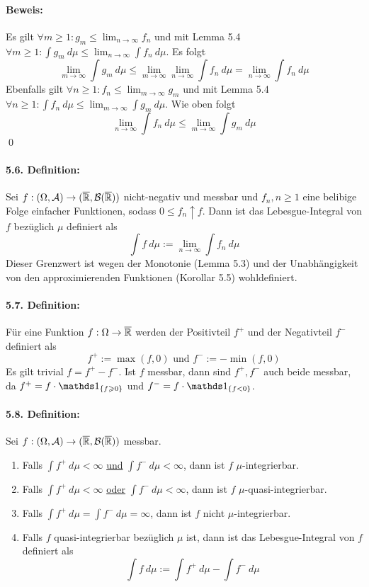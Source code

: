  \paragraph{Beweis:}Es gilt $\forall m\geq1:g_m\leq\displaystyle\lim_{n\to\infty}f_n$ und mit Lemma 5.4 $\forall m\geq1:\int g_m\ d\mu\leq\lim_{n\to\infty}\int f_n\ d\mu$. Es folgt 
 $$\lim_{m\to\infty}\int g_m\ d\mu\leq\lim_{m\to\infty}\lim_{n\to\infty}\int f_n\ d\mu=\lim_{n\to\infty}\int f_n\ d\mu$$
 Ebenfalls gilt $\forall n\geq1:f_n\leq\lim_{m\to\infty}g_m$ und mit Lemma 5.4 $\forall n\geq1:\int f_n\ d\mu\leq\lim_{m\to\infty}\int g_m\ d\mu$. Wie oben folgt
 $$\lim_{n\to\infty}\int f_n\ d\mu\leq\lim_{m\to\infty}\int g_m\ d\mu$$
 \qed
 
 \paragraph{5.6. Definition:}Sei $f:(\Omega,\mathcal{A})\to(\overline{\mathbb{R}},\mathcal{B}(\overline{\mathbb{R}}))$ nicht-negativ und messbar und $f_n,n\geq1$ eine belibige Folge einfacher Funktionen, sodass $0\leq f_n\uparrow f$. Dann ist das Lebesgue-Integral von $f$ bez\"uglich $\mu$ definiert als
 $$\int f\ d\mu:=\lim_{n\to\infty}\int f_n\ d\mu$$
 Dieser Grenzwert ist wegen der Monotonie (Lemma 5.3) und der Unabh\"angigkeit von den approximierenden Funktionen (Korollar 5.5) wohldefiniert. 
 
 \paragraph{5.7. Definition:}F\"ur eine Funktion $f:\Omega\to\overline{\mathbb{R}}$ werden der Positivteil $f^+$ und der Negativteil $f^-$ definiert als
 $$f^+:=\max(f,0)\text{ und }f^-:=-\min(f,0)$$
 Es gilt trivial $f=f^+-f^-$. Ist $f$ messbar, dann sind $f^+,f^-$ auch beide messbar, da $f^+=f\cdot\ind{\{f\geq0\}}$ und $f^-=f\cdot\ind{\{f<0\}}$.
 
 \paragraph{5.8. Definition:}Sei $f:(\Omega,\mathcal{A})\to(\overline{\mathbb{R}},\mathcal{B}(\overline{\mathbb{R}}))$ messbar.
 \begin{enumerate}[label=(\roman*)]
     \item Falls $\displaystyle\int f^+\ d\mu<\infty$ \underline{und} $\displaystyle\int f^-\ d\mu<\infty$, dann ist $f$ $\mu$-integrierbar.
     \item Falls $\displaystyle\int f^+\ d\mu<\infty$ \underline{oder} $\displaystyle\int f^-\ d\mu<\infty$, dann ist $f$ $\mu$-quasi-integrierbar.
     \item Falls $\displaystyle\int f^+\ d\mu=\displaystyle\int f^-\ d\mu=\infty$, dann ist $f$ nicht $\mu$-integrierbar.
     \item Falls $f$ quasi-integrierbar bez\"uglich $\mu$ ist, dann ist das Lebesgue-Integral von $f$ definiert als 
     $$\int f\ d\mu:=\int f^+\ d\mu-\int f^-\ d\mu$$
 \end{enumerate}
 
